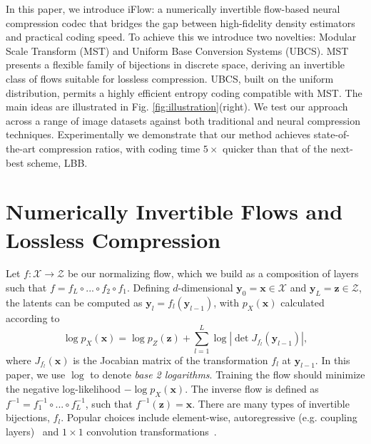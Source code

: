 \documentclass{article}
\begin{document}
In this paper, we introduce iFlow: a numerically invertible flow-based neural compression codec that bridges the gap between high-fidelity density estimators and practical coding speed. To achieve this we introduce two novelties: Modular Scale Transform (MST) and Uniform Base Conversion Systems (UBCS). MST presents a flexible family of bijections in discrete space, deriving an invertible class of flows suitable for lossless compression. UBCS, built on the uniform distribution, permits a highly efficient entropy coding compatible with MST.
The main ideas are illustrated in Fig. \ref{fig:illustration}(right). We test our approach across a range of image datasets against both traditional and neural compression techniques. Experimentally we demonstrate that our method achieves state-of-the-art compression ratios, with coding time $5 \times$ quicker than that of the next-best scheme, LBB.











\section{Numerically Invertible Flows and Lossless Compression}

Let $f: \mathcal{X} \to \mathcal{Z}$ be our normalizing flow, which we build as a composition of layers such that $f = f_L \circ ... \circ f_2 \circ f_1$. Defining  $d$-dimensional $\mathbf{y}_0 = \mathbf{x} \in \mathcal{X}$ and $\mathbf{y}_L = \mathbf{z} \in \mathcal{Z}$, the latents can be computed as $\mathbf{y}_l = f_l (\mathbf{y}_{l-1})$, with $p_X(\mathbf{x})$ calculated according to
\begin{equation}
\log p_X(\mathbf{x}) = \log p_Z (\mathbf{z}) + \sum_{l=1}^L \log |\det J_{f_l} (\mathbf{y}_{l-1})|,
\end{equation}
where $J_{f_l} (\mathbf{x})$ is the Jocabian matrix of the transformation $f_l$ at $\mathbf{y}_{l-1}$. In this paper, we use $\log$ to denote \textit{base 2 logarithms}. Training the flow should minimize the negative log-likelihood $- \log p_X (\mathbf{x})$.
The inverse flow is defined as $f^{-1} = f^{-1}_1 \circ ... \circ f^{-1}_L$, such that $f^{-1}(\mathbf{z}) = \mathbf{x}$. There are many types of invertible bijections, $f_l$. Popular choices include element-wise, autoregressive (e.g. coupling layers)~\cite{zhang2021ivpf} and $1 \times 1$ convolution transformations~\cite{kingma2018glow}.
\end{document}
